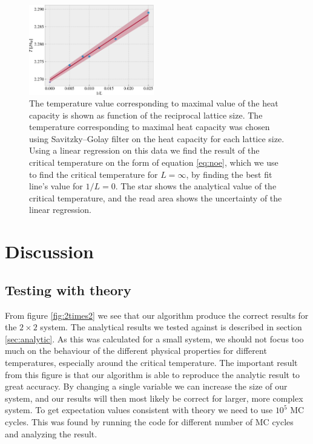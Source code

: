\documentclass[%
 reprint,
nofootinbib,
aps,
]{revtex4-1}
\begin{document}
\begin{figure}
  \centering
  \includegraphics[width=0.485\textwidth]{../figures/TC.pdf}
  \caption{The temperature value corresponding to maximal value of the heat capacity is shown as function of the reciprocal lattice size. The temperature corresponding to maximal heat capacity was chosen using Savitzky–Golay filter on the heat capacity for each lattice size. Using a linear regression \cite{squires} on this data we find the result of the critical temperature on the form of equation \eqref{eq:noe}, which we use to find the critical temperature for $L=\infty$, by finding the best fit line's value for $1/L=0$. The star shows the analytical value of the critical temperature, and the read area shows the uncertainty of the linear regression.}
  \label{fig:find_Tc}
\end{figure}


\section{Discussion}
\subsection{Testing with theory}
From figure \vref{fig:2times2} we see that our algorithm produce the correct results for the $2\times 2$ system. The analytical results we tested against is described in section \vref{sec:analytic}. As this was calculated for a small system, we should not focus too much on the behaviour of the different physical properties for different temperatures, especially around the critical temperature. The important result from this figure is that our algorithm is able to reproduce the analytic result to great accuracy. By changing a single variable we can increase the size of our system, and our results will then most likely be correct for larger, more complex system. To get expectation values consistent with theory we need to use $10^5$ MC cycles. This was found by running the code for different number of MC cycles and analyzing the result.
\end{document}
